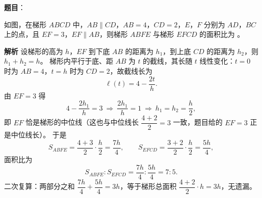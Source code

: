 \begin{answer}

\textbf{题目}：

如图，在梯形 $ABCD$ 中，$AB\parallel CD$，$AB=4$，$CD=2$，$E$，$F$ 分别为 $AD$，$BC$ 上的点，且 $EF=3$，$EF\parallel AB$，则梯形 $ABFE$ 与梯形 $EFCD$ 的面积比为 \gkblank{}。
\nopagebreak[4]
\begin{center}\end{center}
\nopagebreak[4]
\textbf{解析}
设梯形的高为 $h$，$EF$ 到下底 $AB$ 的距离为 $h_1$，到上底 $CD$ 的距离为 $h_2$，则 $h_1+h_2=h$。
梯形内平行于底、距 $AB$ 为 $t$ 的截线，其长随 $t$ 线性变化：$t=0$ 时为 $AB=4$，$t=h$ 时为 $CD=2$，故截线长为
\nopagebreak[4]
\[
\ell(t)=4-\frac{2t}{h}.
\]
由 $EF=3$ 得
\nopagebreak[4]
\[
4-\frac{2h_1}{h}=3\ \Longrightarrow\ \frac{2h_1}{h}=1\ \Longrightarrow\ h_1=h_2=\frac h2,
\]
即 $EF$ 恰是梯形的中位线（这也与中位线长 $\dfrac{4+2}{2}=3$ 一致，题目给的 $EF=3$ 正是中位线长）。
于是
\nopagebreak[4]
\[
S_{ABFE}=\frac{4+3}{2}\cdot\frac h2=\frac{7h}{4},\qquad
S_{EFCD}=\frac{3+2}{2}\cdot\frac h2=\frac{5h}{4},
\]
面积比为
\nopagebreak[4]
\[
S_{ABFE}:S_{EFCD}=\frac{7h}{4}:\frac{5h}{4}=7:5.
\]
二次复算：两部分之和 $\dfrac{7h}{4}+\dfrac{5h}{4}=3h$，等于梯形总面积 $\dfrac{4+2}{2}\cdot h=3h$，无遗漏。


\end{answer}
